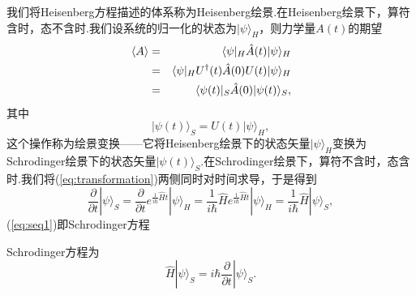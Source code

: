         我们将Heisenberg方程描述的体系称为Heisenberg绘景.在Heisenberg绘景下，算符含时，态不含时.我们设系统的归一化的状态为$\vert\psi\rangle_H$，则力学量$A(t)$的期望
        \begin{eqnarray}
            \langle A\rangle&=&\langle\psi\vert_H\hat{A}(t)\vert\psi\rangle_H\notag\\
            &=&\langle\psi\vert_H U^\dagger(t)\hat{A}(0)U(t)\vert\psi\rangle_H\notag\\
            &=&\langle\psi(t)\vert_S\hat{A}(0)\vert\psi(t)\rangle_S,
        \end{eqnarray}
        其中
        \begin{equation}\label{eq:transformation}
            \vert\psi(t)\rangle_S=U(t)\vert\psi\rangle_H,
        \end{equation}
        这个操作称为绘景变换——它将Heisenberg绘景下的状态矢量$\vert\psi\rangle_H$变换为Schrodinger绘景下的状态矢量$\vert\psi(t)\rangle_S$.在Schrodinger绘景下，算符不含时，态含时.我们将(\ref{eq:transformation})两侧同时对时间求导，于是得到
        \begin{equation}\label{eq:seq1}
            \frac{\partial}{\partial t}|\psi\rangle_{S}=\frac{\partial}{\partial t} e^{\frac{1}{i \hbar} \hat{H} t}|\psi\rangle_{H}=\frac{1}{i \hbar} \hat{H} e^{\frac{1}{i \hbar} \hat{H} t}|\psi\rangle_{H}=\frac{1}{i\hbar} \hat{H}|\psi\rangle_{S},
        \end{equation}
        (\ref{eq:seq1})即Schrodinger方程
        \begin{definition}Schrodinger方程为
            \begin{equation}\label{eq:seq2}
                \hat{H}|\psi\rangle_{S}=i\hbar\frac{\partial}{\partial t}|\psi\rangle_{S}.
            \end{equation}
        \end{definition}